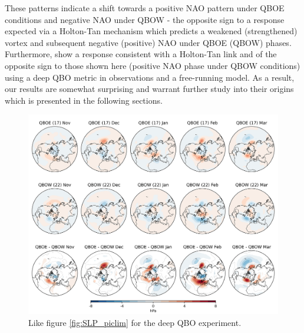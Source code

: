These patterns indicate a shift towards a positive NAO pattern under QBOE conditions and negative NAO under QBOW - the opposite sign to a response expected via a Holton-Tan mechanism which predicts a weakened (strengthened) vortex and subsequent negative (positive) NAO under QBOE (QBOW) phases. Furthermore, \cite{andrewsObserved2019d} show a response consistent with a Holton-Tan link and of the opposite sign to those shown here (positive NAO phase under QBOW conditions) using a deep QBO metric in observations and a free-running model. As a result, our results are somewhat surprising and warrant further study into their origins which is presented in the following sections.

\begin{figure}[h!]
\begin{center}
\noindent\includegraphics[width =0.8\linewidth]{Figures/Figures-deepQBO/LAGGED_SLP_composites_individual_months_QBO_phases_U_d_higher_50hPa_5thresh.png}
\caption[MSLP composites under different QBO phases in the deep QBO simulation]{Like figure \ref{fig:SLP_piclim} for the deep QBO experiment.}
\label{fig:SLP_deep}
\end{center}
\end{figure}


